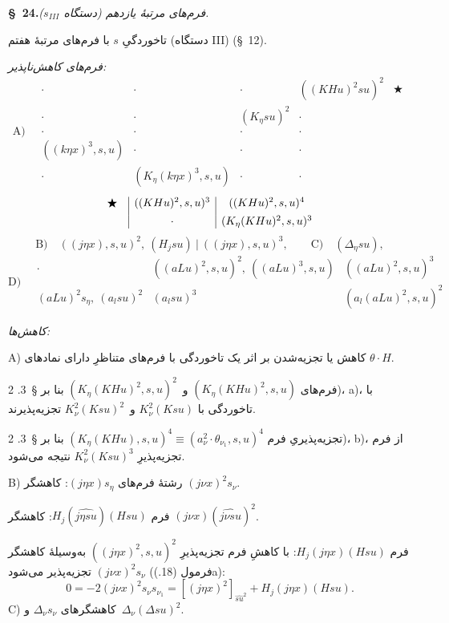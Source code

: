 \documentclass[11pt]{article}
\providecommand{\D}{\Delta}
\begin{document}
\begin{center}\textbf{\S\ 24.}\quad\emph{فرم‌های مرتبهٔ یازدهم (دستگاه $s_{III}$).}\end{center}
تاخوردگیِ $s$ با فرم‌های مرتبهٔ هفتم (دستگاه III) (\S\ 12).

\noindent\emph{فرم‌های کاهش‌ناپذیر:}
\[
\text{A)}\quad
\begin{array}{c|c|c|c|c}
\cdot&\cdot&\cdot&((KHu)^2su)^2&\bigstar\\[0.35em]
\cdot&\cdot&(K_\eta su)^2&\cdot&\\[0.35em]
\cdot&\cdot&\cdot&\cdot&\\[0.35em]
((k\eta x)^3,s,u)&\cdot&\cdot&\cdot&\\[0.35em]
\cdot&(K_\eta(k\eta x)^3,s,u)&\cdot&\cdot&
\end{array}
\]
\[
\begin{array}{c@{\quad}|c|c}
\bigstar&((KHu)^2,s,u)^3&((KHu)^2,s,u)^4\\[0.45em]
&\cdot&(K_\eta(KHu)^2,s,u)^3
\end{array}
\]
\[
\text{B)}\quad ((j\eta x),s,u)^2,\ (H_jsu)\ \big|\ ((j\eta x),s,u)^3,
\qquad \text{C)}\quad (\D_\eta su),
\]
\[
\text{D)}\quad
\begin{array}{c|c|c}
\cdot&((aLu)^2,s,u)^2,\ ((aLu)^3,s,u)&((aLu)^2,s,u)^3\\[0.5em]
(aLu)^2s_\eta,\ (a_lsu)^2&(a_lsu)^3&(a_l(aLu)^2,s,u)^2
\end{array}
\]

\noindent\emph{کاهش‌ها:}

A) کاهش یا تجزیه‌شدن بر اثر یک تاخوردگی با فرم‌های متناظرِ دارای نمادهای $\theta\cdot H$.

فرم‌های $(K_\eta(KHu)^2,s,u)$ و~$(K_\eta(KHu)^2,s,u)^2$ بنا بر \S\ 3. 2)، a)، با تاخوردگی با $K_\nu^2(Ksu)$ و~$K_\nu^2(Ksu)^2$ تجزیه‌پذیرند.

تجزیه‌پذیریِ فرم $(K_\eta(KHu),s,u)^4\equiv(a_\nu^2\cdot\theta_{\nu_1},s,u)^4$ بنا بر \S\ 3. 2)، b)، از فرم تجزیه‌پذیرِ $K_\nu^2(Ksu)^3$ نتیجه می‌شود.

B) رشتهٔ فرم‌های $(j\eta x)s_\eta$: کاهشگر $(j\nu x)^2s_\nu$.

فرم $H_j(\widehat{j\eta su})(Hsu)$: کاهشگر $(j\nu x)(\widehat{j\nu su})^2$.

فرم $H_j(j\eta x)(Hsu)$: با کاهشِ فرم تجزیه‌پذیرِ $((j\eta x)^2,s,u)^2$ به‌وسیلهٔ کاهشگر $(j\nu x)^2s_\nu$ تجزیه‌پذیر می‌شود (فرمول (18.)a):
\[
0=-2(j\nu x)^2s_\nu s_{\nu_1}=[(j\eta x)^2]_{\widehat{su}^2}+H_j(j\eta x)(Hsu).
\]
C) کاهشگرهای $\D_\nu s_\nu$ و~$\D_\nu(\D su)^2$.
\end{document}
